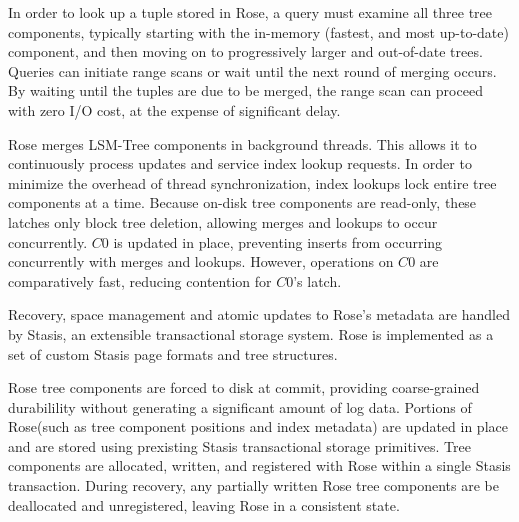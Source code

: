 \documentclass{vldb}
\newcommand{\rows}{Rose\xspace}
\newcommand{\rowss}{Rose's\xspace}
\begin{document}

In order to look up a tuple stored in \rows, a query must examine all
three tree components, typically starting with the in-memory (fastest, and most
up-to-date) component, and then moving on to progressively larger and
out-of-date trees.  Queries can initiate range scans or wait until the next round
of merging occurs.  By waiting until the tuples are due to be merged, the
range scan can proceed with zero I/O cost, at the expense of significant
delay.

\rows merges LSM-Tree components in background threads.  This allows
it to continuously process updates and service index lookup requests.
In order to minimize the overhead of thread synchronization, index
lookups lock entire tree components at a time.  Because on-disk tree
components are read-only, these latches only block tree deletion,
allowing merges and lookups to occur concurrently.  $C0$ is
updated in place, preventing inserts from occurring concurrently with
merges and lookups.  However, operations on $C0$ are comparatively
fast, reducing contention for $C0$'s latch.

Recovery, space management and atomic updates to \rowss metadata are
handled by Stasis\cite{stasis}, an extensible transactional storage system.  \rows is
implemented as a set of custom Stasis page formats and tree structures.

\rows tree components are forced to disk at commit, providing
coarse-grained durabilility without generating a significant amount of
log data.  Portions of \rows (such as tree component
positions and index metadata) are updated in place and are stored using prexisting Stasis transactional
storage primitives.  Tree components are allocated, written, and
registered with \rows within a single Stasis transaction.  During
recovery, any partially written \rows tree components are be
deallocated and unregistered, leaving \rows in a consistent state.
\end{document}
